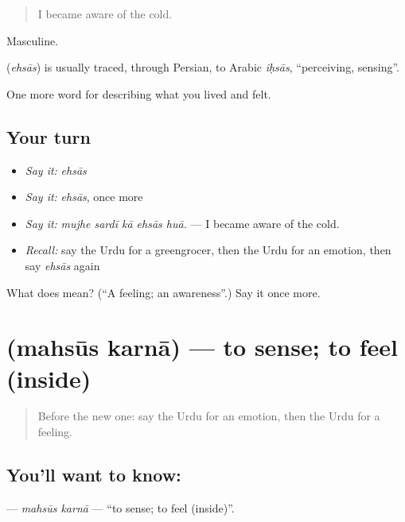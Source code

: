 \begin{quote}
I became aware of the cold.
\end{quote}

Masculine.

\begin{cousinweb}
\textbf{} (\emph{ehsās}) is usually traced, through Persian, to Arabic \emph{iḥsās}, \textquotedblleft{}perceiving, sensing\textquotedblright{}.
\end{cousinweb}

\begin{grammarlens}[title={What you've built}]
One more word for describing what you lived and felt.
\end{grammarlens}

\subsection*{Your turn}
\begin{itemize}
\raggedright
  \item \emph{Say it:} \emph{ehsās}
  \item \emph{Say it:} \emph{ehsās}, once more
  \item \emph{Say it:} \emph{mujhe sardī kā ehsās huā.} — I became aware of the cold.
  \item \emph{Recall:} say the Urdu for a greengrocer, then the Urdu for an emotion, then say \emph{ehsās} again
\end{itemize}

\begin{tcolorbox}[breakable,colback=teal!4,colframe=teal!35!black,title={Before you move on}]
What does  mean? (\textquotedblleft{}A feeling; an awareness\textquotedblright{}.) Say it once more.
\end{tcolorbox}
\section[\texorpdfstring{\ur{محسوس} \ur{کرنا} (mahsūs karnā)}{محسوس کرنا (mahsūs karnā)}]{  (mahsūs karnā) — to sense; to feel (inside)}

\label{lesson:UR-C440-mahsus-karna}



\begin{quote}
Before the new one: say the Urdu for an emotion, then the Urdu for a feeling.
\end{quote}

\subsection*{You'll want to know:  }
\textbf{ } — \emph{mahsūs karnā} — \textquotedblleft{}to sense; to feel (inside)\textquotedblright{}.

